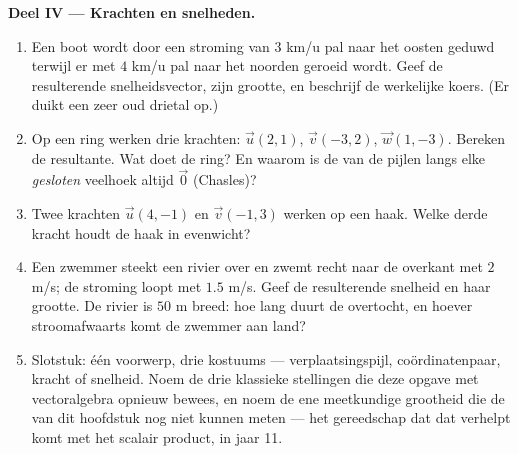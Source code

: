 \begin{problem}
\medskip
\noindent\textbf{Deel IV --- Krachten en snelheden.}
\begin{enumerate}[resume]
  \item Een boot wordt door een stroming van $3$ km/u pal naar het oosten
        geduwd terwijl er met $4$ km/u pal naar het noorden geroeid wordt.
        Geef de resulterende snelheidsvector, zijn grootte, en beschrijf de
        werkelijke koers. (Er duikt een zeer oud drietal op.)
  \item Op een ring werken drie krachten: $\vec u(2, 1)$, $\vec v(-3, 2)$,
        $\vec w(1, -3)$. Bereken de resultante. Wat doet de ring? En waarom
        is de  van de pijlen langs elke \emph{gesloten} veelhoek altijd
        $\vec 0$ (Chasles)?
  \item Twee krachten $\vec u(4, -1)$ en $\vec v(-1, 3)$ werken op een haak.
        Welke derde kracht houdt de haak in evenwicht?
  \item Een zwemmer steekt een rivier over en zwemt recht naar de overkant
        met $2$ m/s; de stroming loopt met $1.5$ m/s. Geef de resulterende
        snelheid en haar grootte. De rivier is $50$ m breed: hoe lang duurt
        de overtocht, en hoever stroomafwaarts komt de zwemmer aan land?
  \item Slotstuk: één voorwerp, drie kostuums --- verplaatsingspijl,
        coördinatenpaar, kracht of snelheid. Noem de drie klassieke
        stellingen die deze opgave met vectoralgebra opnieuw bewees, en noem
        de ene meetkundige grootheid die de  van dit hoofdstuk nog
        niet kunnen meten --- het gereedschap dat dat verhelpt komt met het
        scalair product, in jaar 11.
\end{enumerate}
\end{problem}
